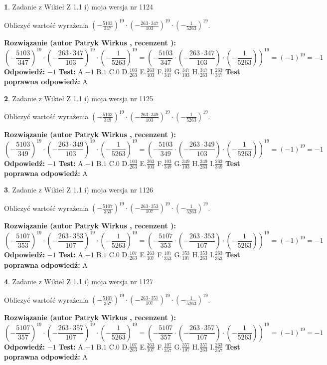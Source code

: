 \documentclass[12pt, a4paper]{article}
\theoremstyle{definition} %
\newtheorem{zad}{}
\newcommand{\zadStart}[1]{\begin{zad}#1\newline}
\newcommand{\zadStop}{\end{zad}}
\newcommand{\rozwStart}[2]{\noindent \textbf{Rozwiązanie (autor #1 , recenzent #2): }\newline}
\newcommand{\rozwStop}{\newline}
\newcommand{\odpStart}{\noindent \textbf{Odpowiedź:}\newline}
\newcommand{\odpStop}{\newline}
\newcommand{\testStart}{\noindent \textbf{Test:}\newline}
\newcommand{\testStop}{\newline}
\newcommand{\kluczStart}{\noindent \textbf{Test poprawna odpowiedź:}\newline}
\newcommand{\kluczStop}{\newline}
\begin{document}
\zadStart{Zadanie z Wikieł Z 1.1 i) moja wersja nr 1124}

Obliczyć wartość wyrażenia $(-\frac{5103}{347})^{19} \cdot (-\frac{263 \cdot 347}{103})^{19} \cdot (-\frac{1}{5263})^{19}$.
\zadStop
\rozwStart{Patryk Wirkus}{}
$$(-\frac{5103}{347})^{19} \cdot (-\frac{263 \cdot 347}{103})^{19} \cdot (-\frac{1}{5263})^{19} = (-\frac{5103}{347} \cdot (-\frac{263 \cdot 347}{103}) \cdot (-\frac{1}{5263}))^{19} = (-1)^{19} = -1$$
\rozwStop
\odpStart
$-1$
\odpStop
\testStart
A.$-1$ B.$1$ C.$0$ D.$\frac{103}{263}$ E.$\frac{263}{103}$
F.$\frac{103}{347}$ G.$\frac{347}{103}$
H.$\frac{347}{263}$
I.$\frac{263}{347}$
\testStop
\kluczStart
A
\kluczStop



\zadStart{Zadanie z Wikieł Z 1.1 i) moja wersja nr 1125}

Obliczyć wartość wyrażenia $(-\frac{5103}{349})^{19} \cdot (-\frac{263 \cdot 349}{103})^{19} \cdot (-\frac{1}{5263})^{19}$.
\zadStop
\rozwStart{Patryk Wirkus}{}
$$(-\frac{5103}{349})^{19} \cdot (-\frac{263 \cdot 349}{103})^{19} \cdot (-\frac{1}{5263})^{19} = (-\frac{5103}{349} \cdot (-\frac{263 \cdot 349}{103}) \cdot (-\frac{1}{5263}))^{19} = (-1)^{19} = -1$$
\rozwStop
\odpStart
$-1$
\odpStop
\testStart
A.$-1$ B.$1$ C.$0$ D.$\frac{103}{263}$ E.$\frac{263}{103}$
F.$\frac{103}{349}$ G.$\frac{349}{103}$
H.$\frac{349}{263}$
I.$\frac{263}{349}$
\testStop
\kluczStart
A
\kluczStop



\zadStart{Zadanie z Wikieł Z 1.1 i) moja wersja nr 1126}

Obliczyć wartość wyrażenia $(-\frac{5107}{353})^{19} \cdot (-\frac{263 \cdot 353}{107})^{19} \cdot (-\frac{1}{5263})^{19}$.
\zadStop
\rozwStart{Patryk Wirkus}{}
$$(-\frac{5107}{353})^{19} \cdot (-\frac{263 \cdot 353}{107})^{19} \cdot (-\frac{1}{5263})^{19} = (-\frac{5107}{353} \cdot (-\frac{263 \cdot 353}{107}) \cdot (-\frac{1}{5263}))^{19} = (-1)^{19} = -1$$
\rozwStop
\odpStart
$-1$
\odpStop
\testStart
A.$-1$ B.$1$ C.$0$ D.$\frac{107}{263}$ E.$\frac{263}{107}$
F.$\frac{107}{353}$ G.$\frac{353}{107}$
H.$\frac{353}{263}$
I.$\frac{263}{353}$
\testStop
\kluczStart
A
\kluczStop



\zadStart{Zadanie z Wikieł Z 1.1 i) moja wersja nr 1127}

Obliczyć wartość wyrażenia $(-\frac{5107}{357})^{19} \cdot (-\frac{263 \cdot 357}{107})^{19} \cdot (-\frac{1}{5263})^{19}$.
\zadStop
\rozwStart{Patryk Wirkus}{}
$$(-\frac{5107}{357})^{19} \cdot (-\frac{263 \cdot 357}{107})^{19} \cdot (-\frac{1}{5263})^{19} = (-\frac{5107}{357} \cdot (-\frac{263 \cdot 357}{107}) \cdot (-\frac{1}{5263}))^{19} = (-1)^{19} = -1$$
\rozwStop
\odpStart
$-1$
\odpStop
\testStart
A.$-1$ B.$1$ C.$0$ D.$\frac{107}{263}$ E.$\frac{263}{107}$
F.$\frac{107}{357}$ G.$\frac{357}{107}$
H.$\frac{357}{263}$
I.$\frac{263}{357}$
\testStop
\kluczStart
A
\kluczStop
\end{document}
